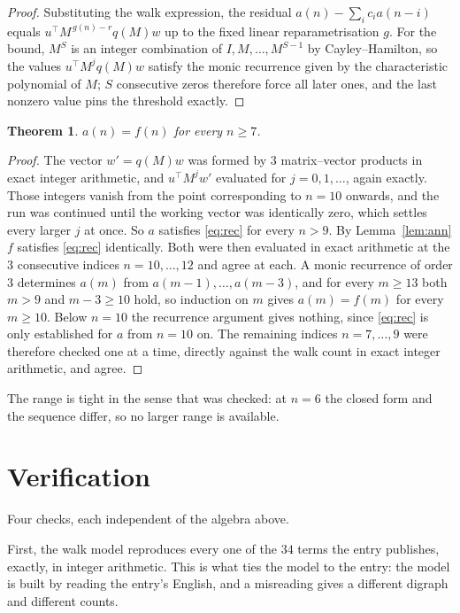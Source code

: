 \documentclass[11pt,a4paper]{article}
\theoremstyle{plain}
\newtheorem{theorem}{Theorem}
\theoremstyle{definition}
\begin{document}
\begin{proof}
Substituting the walk expression, the residual $a(n)-\sum_ic_ia(n-i)$ equals
$u^{\!\top}M^{\,g(n)-r}q(M)w$ up to the fixed linear reparametrisation $g$. For the bound,
$M^{S}$ is an integer combination of $I,M,\dots,M^{S-1}$ by Cayley--Hamilton, so the values
$u^{\!\top}M^{j}q(M)w$ satisfy the monic recurrence given by the characteristic polynomial of
$M$; $S$ consecutive zeros therefore force all later ones, and the last nonzero value pins the
threshold exactly.
\end{proof}

\begin{theorem}
$a(n)=f(n)$ for every $n\ge7$.
\end{theorem}

\begin{proof}
The vector $w'=q(M)w$ was formed by $3$ matrix--vector products in exact integer
arithmetic, and $u^{\!\top}M^{j}w'$ evaluated for $j=0,1,\dots$, again exactly. Those integers
vanish from the point corresponding to $n=10$ onwards, and the run was continued until the
working vector was identically zero, which settles every larger $j$ at once. So $a$ satisfies
\eqref{eq:rec} for every $n>9$. By Lemma~\ref{lem:ann} $f$ satisfies \eqref{eq:rec}
identically. Both were then evaluated in exact arithmetic at the $3$ consecutive indices
$n=10,\dots,12$ and agree at each. A monic recurrence of order $3$
determines $a(m)$ from $a(m-1),\dots,a(m-3)$, and for every $m\ge13$ both
$m>9$ and $m-3\ge10$ hold, so induction on $m$ gives $a(m)=f(m)$ for every
$m\ge10$.
Below $n=10$ the recurrence argument gives nothing, since \eqref{eq:rec} is only
established for $a$ from $n=10$ on. The remaining indices $n=7,\dots,9$ were
therefore checked one at a time, directly against the walk count in exact integer arithmetic,
and agree.
\end{proof}

The range is tight in the sense that was checked: at $n=6$ the closed form and the sequence differ, so no larger range is available.

\section{Verification}

Four checks, each independent of the algebra above.

First, the walk model reproduces every one of the $34$ terms the entry publishes,
exactly, in integer arithmetic. This is what ties the model to the entry: the model is built
by reading the entry's English, and a misreading gives a different digraph and different
counts.
\end{document}
